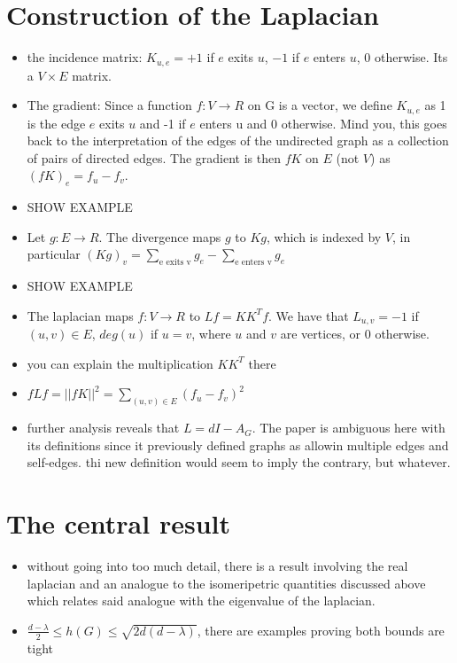 \documentclass{article}
\begin{document}
\section{Construction of the Laplacian}
\begin{itemize}
  \item the incidence matrix: $K_{u,e} = +1$ if $e$ exits $u$, $-1$ if $e$ enters $u$, $0$ otherwise. Its a $V \times E$ matrix.
  \item The gradient: Since a function $f: V \rightarrow R$ on G is a vector, we define $K_{u, e}$ as 1 is the edge $e$ exits $u$ and -1 if $e$ enters u and 0 otherwise. Mind you, this goes back to the interpretation of the edges of the undirected graph as a collection of pairs of directed edges. The gradient is then $fK$ on $E$ (not $V$) as $(fK)_e = f_u - f_v$. 
  \item SHOW EXAMPLE
  \item Let $g: E \rightarrow R$. The divergence maps $g$ to $Kg$, which is indexed by $V$, in particular $(Kg)_v = \sum_{\text{e exits v}} g_e - \sum_{\text{e enters v}} g_e$
  \item SHOW EXAMPLE
  \item The laplacian maps $f: V \rightarrow R$ to $Lf = KK^Tf$. We have that $L_{u,v} = -1$ if $(u,v) \in E$, $deg(u)$ if $u = v$, where $u$ and $v$ are vertices, or 0 otherwise.
  \item you can explain the multiplication $KK^T$ there
  \item $fLf = || fK||^2 = \sum_{(u, v) \in E} (f_u - f_v)^2$
  \item further analysis reveals that $L = dI - A_G$. The paper is ambiguous here with its definitions since it previously defined graphs as allowin multiple edges and self-edges. thi new definition would seem to imply the contrary, but whatever.
\end{itemize}
\section{The central result}
\begin{itemize}
  \item without going into too much detail, there is a result involving the real laplacian and an analogue to the isomeripetric quantities discussed above which relates said analogue with the eigenvalue of the laplacian.
  \item $\frac{d - \lambda}{2} \leq h(G) \leq \sqrt{2d(d -\lambda)}$, there are examples proving both bounds are tight
\end{itemize}
\end{document}
